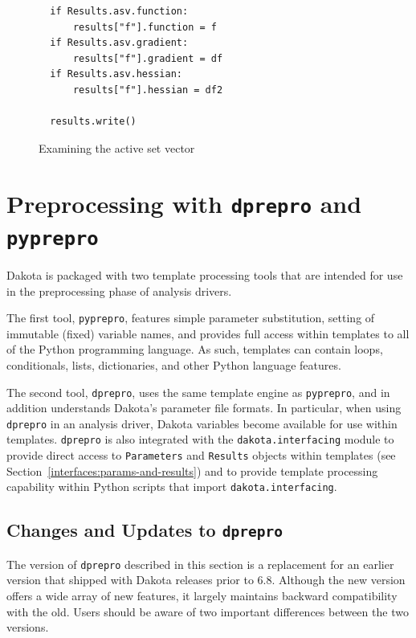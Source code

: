{\begin{figure}
\begin{bigbox}
\begin{small}
\begin{verbatim}
  if Results.asv.function:
      results["f"].function = f
  if Results.asv.gradient:
      results["f"].gradient = df
  if Results.asv.hessian:
      results["f"].hessian = df2

  results.write()
\end{verbatim}


\end{small}
\end{bigbox}
\caption{Examining the active set vector}
\label{diexample:asv}
\end{figure}

\section{Preprocessing with \texttt{dprepro} and \texttt{pyprepro}}\label{interfaces:dprepro-and-pyprepro}

Dakota is packaged with two template processing tools that are
intended for use in the preprocessing phase of analysis drivers.

The first tool, \texttt{pyprepro}, features simple parameter 
substitution, setting of immutable (fixed) variable names, and 
provides full access within templates to all of the Python programming 
language. As such, templates can contain loops, conditionals, lists, 
dictionaries, and other Python language features.

The second tool, \texttt{dprepro}, uses the same template engine
as \texttt{pyprepro}, and in addition understands Dakota's parameter
file formats. In particular, when using \texttt{dprepro} in an analysis driver, 
Dakota variables become available for use within templates. \texttt{dprepro} 
is also integrated with the \texttt{dakota.interfacing} module to provide direct
access to \texttt{Parameters} and \texttt{Results} objects within templates 
(see Section~\ref{interfaces:params-and-results}) and to provide template 
processing capability within Python scripts that import 
\texttt{dakota.interfacing}.

\subsection{Changes and Updates to \texttt{dprepro}}\label{interfaces:dprepro-changes}

The version of \texttt{dprepro} described in this section is a replacement for 
an earlier version that shipped with Dakota releases prior to 6.8. Although
the new version offers a wide array of new features, it largely maintains 
backward compatibility with the old. Users should be aware of two important 
differences between the two versions.

}
